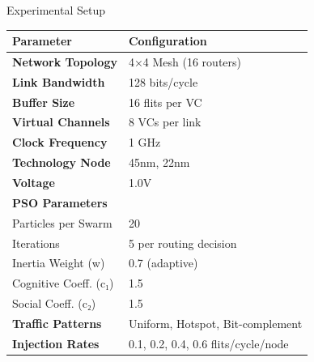 \documentclass[10pt]{beamer}
\begin{document}
\begin{frame}{Experimental Setup}
    \begin{table}
        \centering
        \small
        \begin{tabular}{@{}ll@{}}
            \toprule
            \textbf{Parameter} & \textbf{Configuration} \\
            \midrule
            \textbf{Network Topology} & 4×4 Mesh (16 routers) \\
            \textbf{Link Bandwidth} & 128 bits/cycle \\
            \textbf{Buffer Size} & 16 flits per VC \\
            \textbf{Virtual Channels} & 8 VCs per link \\
            \textbf{Clock Frequency} & 1 GHz \\
            \textbf{Technology Node} & 45nm, 22nm \\
            \textbf{Voltage} & 1.0V \\
            \midrule
            \textbf{PSO Parameters} & \\
            Particles per Swarm & 20 \\
            Iterations & 5 per routing decision \\
            Inertia Weight (w) & 0.7 (adaptive) \\
            Cognitive Coeff. (c₁) & 1.5 \\
            Social Coeff. (c₂) & 1.5 \\
            \midrule
            \textbf{Traffic Patterns} & Uniform, Hotspot, Bit-complement \\
            \textbf{Injection Rates} & 0.1, 0.2, 0.4, 0.6 flits/cycle/node \\
            \bottomrule
        \end{tabular}
    \end{table}
\end{frame}
\end{document}
